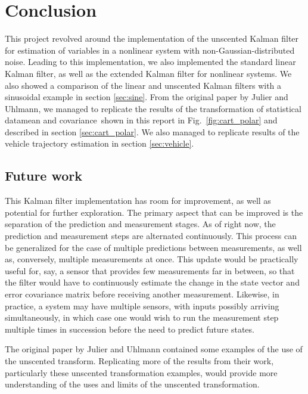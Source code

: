 \documentclass[]{article}
\begin{document}
\section{Conclusion}

This project revolved around the implementation of the unscented Kalman filter for estimation of variables in a nonlinear system with non-Gaussian-distributed noise. Leading to this implementation, we also implemented the standard linear Kalman filter, as well as the extended Kalman filter for nonlinear systems. We also showed a comparison of the linear and unscented Kalman filters with a sinusoidal example in section \ref{sec:sine}. From the original paper by Julier and Uhlmann, we managed to replicate the results of the transformation of statistical data\textemdash mean and covariance\textemdash\ shown in this report in Fig.~\ref{fig:cart_polar} and described in section \ref{sec:cart_polar}. We also managed to replicate results of the vehicle trajectory estimation in section \ref{sec:vehicle}.

\subsection{Future work}

This Kalman filter implementation has room for improvement, as well as potential for further exploration. The primary aspect that can be improved is the separation of the prediction and measurement stages. As of right now, the prediction and measurement steps are alternated continuously. This process can be generalized for the case of multiple predictions between measurements, as well as, conversely, multiple measurements at once. This update would be practically useful for, say, a sensor that provides few measurements far in between, so that the filter would have to continuously estimate the change in the state vector and error covariance matrix before receiving another measurement. Likewise, in practice, a system may have multiple sensors, with inputs possibly arriving simultaneously, in which case one would wish to run the measurement step multiple times in succession before the need to predict future states.

The original paper by Julier and Uhlmann contained some examples of the use of the unscented transform. Replicating more of the results from their work, particularly these unscented transformation examples, would provide more understanding of the uses and limits of the unscented transformation.
\end{document}
